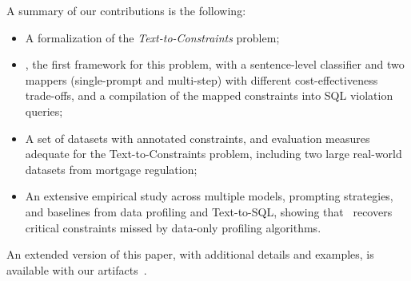 A summary of our contributions is the following:
\begin{itemize}[leftmargin=0.35cm]
\item A formalization of the \emph{Text-to-Constraints} problem;
\item \system, the first framework for this problem, with a sentence-level classifier and two mappers (single-prompt and multi-step) with different cost-effectiveness trade-offs, and a compilation of the mapped constraints into SQL violation queries;
\item A set of datasets with annotated constraints, and evaluation measures adequate for the Text-to-Constraints problem, including two large real-world datasets from mortgage regulation;
\item An extensive empirical study across multiple models, prompting strategies, and baselines from data profiling and Text-to-SQL, showing that \system\ recovers critical constraints missed by data-only profiling algorithms.
\end{itemize}
\noindent An extended version of this paper, with additional details and examples, is available with our artifacts~\cite{normafull}.


